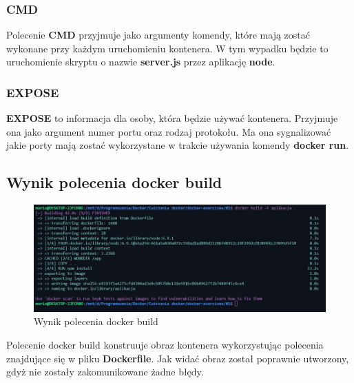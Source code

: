 \documentclass[12pt, a4paper]{article}
\begin{document}
        \subsubsection{CMD}
            Polecenie \textbf{CMD} przyjmuje jako argumenty komendy, które mają zostać wykonane przy każdym uruchomieniu kontenera. W tym wypadku będzie to uruchomienie skryptu o nazwie \textbf{server.js} przez aplikację \textbf{node}.
        \subsubsection{EXPOSE}
            \textbf{EXPOSE} to informacja dla osoby, która będzie używać kontenera. Przyjmuje ona jako argument numer portu oraz rodzaj protokołu. Ma ona sygnalizować jakie porty mają zostać wykorzystane w trakcie używania komendy \textbf{docker run}.
    \subsection{Wynik polecenia docker build}
        \begin{figure}[!h]
            \centering
            \includegraphics[width=\textwidth]{docker-build.JPG}
            \caption{Wynik polecenia docker build}
            \label{fig:my_label}
        \end{figure}
        Polecenie docker build konstruuje obraz kontenera wykorzystując polecenia znajdujące się w pliku \textbf{Dockerfile}. Jak widać obraz został poprawnie utworzony, gdyż nie zostały zakomunikowane żadne błędy.
\newpage
\end{document}
